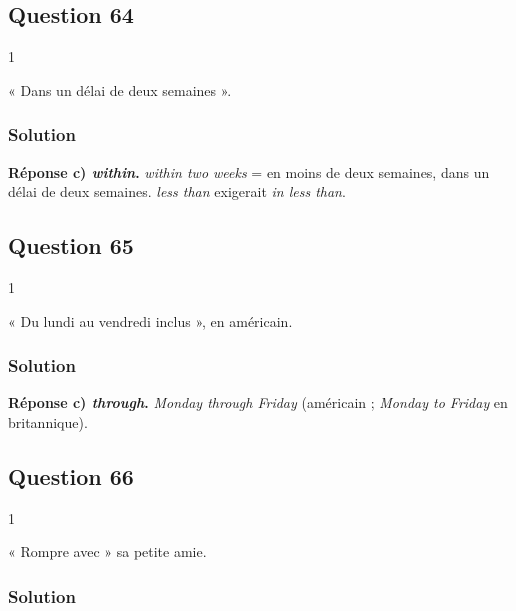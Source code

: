 \documentclass[11pt,a4paper]{article}
\begin{document}
\hypertarget{question-64}{%
\subsection{Question 64}\label{question-64}}

\begin{indication}{1}

« Dans un délai de deux semaines ».

\end{indication}

\hypertarget{solution-63}{%
\subsubsection{Solution}\label{solution-63}}

\textbf{Réponse c) \emph{within}.} \emph{within two weeks} = en moins de deux semaines, dans un délai de deux semaines. \emph{less than} exigerait \emph{in less than}.

\hypertarget{question-65}{%
\subsection{Question 65}\label{question-65}}

\begin{indication}{1}

« Du lundi au vendredi inclus », en américain.

\end{indication}

\hypertarget{solution-64}{%
\subsubsection{Solution}\label{solution-64}}

\textbf{Réponse c) \emph{through}.} \emph{Monday through Friday} (américain ; \emph{Monday to Friday} en britannique).

\hypertarget{question-66}{%
\subsection{Question 66}\label{question-66}}

\begin{indication}{1}

« Rompre avec » sa petite amie.

\end{indication}

\hypertarget{solution-65}{%
\subsubsection{Solution}\label{solution-65}}
\end{document}
